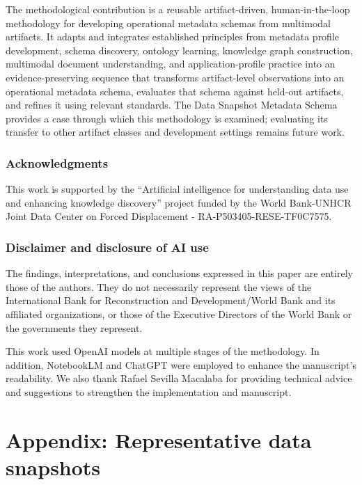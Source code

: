 \documentclass{article}
\begin{document}
The methodological contribution is a reusable artifact-driven, human-in-the-loop methodology for developing operational metadata schemas from multimodal artifacts. It adapts and integrates established principles from metadata profile development, schema discovery, ontology learning, knowledge graph construction, multimodal document understanding, and application-profile practice into an evidence-preserving sequence that transforms artifact-level observations into an operational metadata schema, evaluates that schema against held-out artifacts, and refines it using relevant standards. The Data Snapshot Metadata Schema provides a case through which this methodology is examined; evaluating its transfer to other artifact classes and development settings remains future work.

\subsubsection*{Acknowledgments}
This work is supported by the “Artificial intelligence for understanding data use and enhancing knowledge discovery” project funded by the World Bank-UNHCR Joint Data Center on Forced Displacement - RA-P503405-RESE-TF0C7575.

\subsubsection*{Disclaimer and disclosure of AI use} 
The findings, interpretations, and conclusions expressed in this paper are entirely those of the authors. They do not necessarily represent the views of the International Bank for Reconstruction and Development/World Bank and its affiliated organizations, or those of the Executive Directors of the World Bank or the governments they represent.

This work used OpenAI models at multiple stages of the methodology. In addition, NotebookLM and ChatGPT were employed to enhance the manuscript’s readability. We also thank Rafael Sevilla Macalaba for providing technical advice and suggestions to strengthen the implementation and manuscript.




\newpage

\appendix

\section{Appendix: Representative data snapshots}
\label{appendix:datasnapshots}
\end{document}
